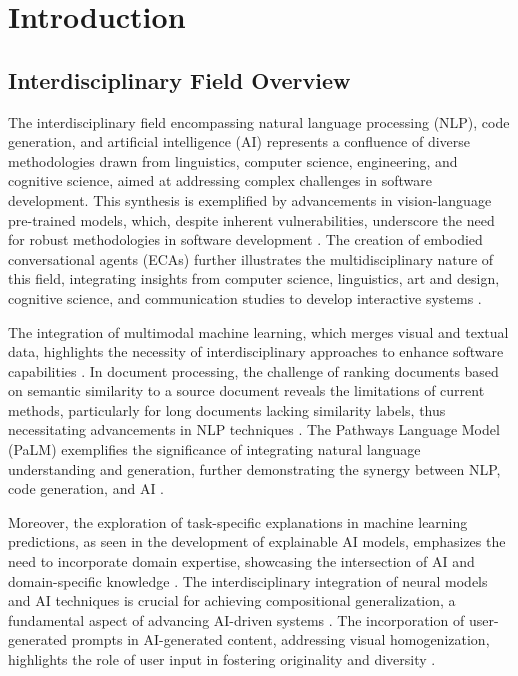 \section{Introduction} \label{sec:Introduction}


\subsection{Interdisciplinary Field Overview} \label{subsec:Interdisciplinary Field Overview}

The interdisciplinary field encompassing natural language processing (NLP), code generation, and artificial intelligence (AI) represents a confluence of diverse methodologies drawn from linguistics, computer science, engineering, and cognitive science, aimed at addressing complex challenges in software development. This synthesis is exemplified by advancements in vision-language pre-trained models, which, despite inherent vulnerabilities, underscore the need for robust methodologies in software development \cite{zhang2024universaladversarialperturbationsvisionlanguage}. The creation of embodied conversational agents (ECAs) further illustrates the multidisciplinary nature of this field, integrating insights from computer science, linguistics, art and design, cognitive science, and communication studies to develop interactive systems \cite{korre2023takesvillagemultidisciplinaritycollaboration}. 



The integration of multimodal machine learning, which merges visual and textual data, highlights the necessity of interdisciplinary approaches to enhance software capabilities \cite{alayrac2022flamingo}. In document processing, the challenge of ranking documents based on semantic similarity to a source document reveals the limitations of current methods, particularly for long documents lacking similarity labels, thus necessitating advancements in NLP techniques \cite{ginzburg2021selfsuperviseddocumentsimilarityranking}. The Pathways Language Model (PaLM) exemplifies the significance of integrating natural language understanding and generation, further demonstrating the synergy between NLP, code generation, and AI \cite{chowdhery2023palm}. 



Moreover, the exploration of task-specific explanations in machine learning predictions, as seen in the development of explainable AI models, emphasizes the need to incorporate domain expertise, showcasing the intersection of AI and domain-specific knowledge \cite{chiaburu2024copronnconceptbasedprototypicalnearest}. The interdisciplinary integration of neural models and AI techniques is crucial for achieving compositional generalization, a fundamental aspect of advancing AI-driven systems \cite{zheng2023layerwiserepresentationfusioncompositional}. The incorporation of user-generated prompts in AI-generated content, addressing visual homogenization, highlights the role of user input in fostering originality and diversity \cite{palmini2024patternscreativityuserinput}. 



